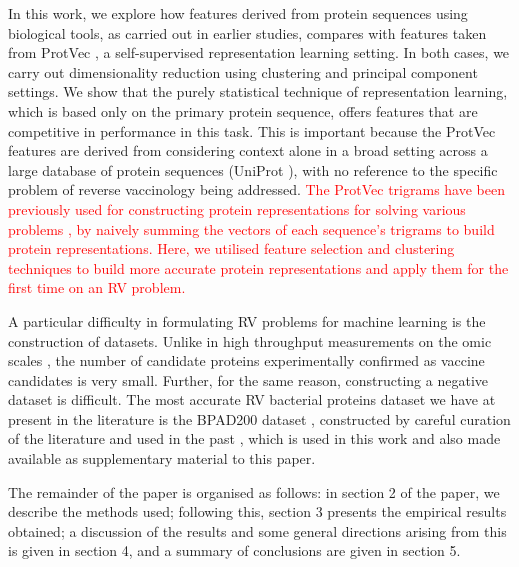 \documentclass[10pt,journal,compsoc,twoside]{IEEEtran}
\begin{document}
In this work, we explore how features derived from protein sequences using biological tools, as carried out in earlier studies, compares with features taken from ProtVec \cite{protvec}, a self-supervised representation learning setting. In both cases, we carry out dimensionality reduction using clustering and principal component settings. We show that the purely statistical technique of representation learning, which is based only on the primary protein sequence, offers features that are competitive in performance in this task. This is important because the ProtVec features are derived from considering context alone in a broad setting across a large database of protein sequences (UniProt \cite{uniprot_2018}), with no reference to the specific problem of reverse vaccinology being addressed. \textcolor{red}{The ProtVec trigrams have been previously used for constructing protein representations for solving various problems \cite{PhosContext2vec,prot_embeddings_re-used_ml}, by naively summing the vectors of each sequence's trigrams to build protein representations. Here, we utilised feature selection and clustering techniques to build more accurate protein representations and apply them for the first time on an RV problem.}
	
A particular difficulty in formulating RV problems for machine learning is the construction of datasets. Unlike in high throughput measurements on the omic scales \cite{haussler-pnas-paper,spellman}, the number of candidate proteins experimentally confirmed as vaccine candidates is very small. Further, for the same reason, constructing a negative dataset is difficult. The most accurate RV bacterial proteins dataset we have at present in the literature is the BPAD200 dataset \cite{heinson_2017}, constructed by careful curation of the literature and used in the past \cite{heinson_2017,heinson_2019,dalsass_2019}, which is used in this work and also made available as supplementary material to this paper. 

The remainder of the paper is organised as follows: in section 2 of the paper, we describe the methods used; following this, section 3 presents the empirical results obtained; a discussion of the results and some general directions arising from this is given in section 4, and a summary of conclusions are given in section 5.


\end{document}
